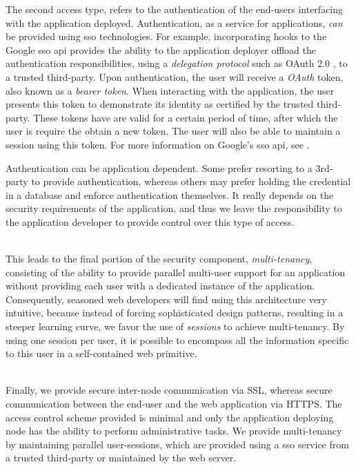 \documentclass[12pt, titlepage]{uo_temp}
\begin{document}
     The second access type, refers to the authentication of the end-users interfacing
     with the application deployed. Authentication, as a service for applications,
     \emph{can} be provided using \gls{sso} technologies. For example, incorporating hooks
     to the Google \gls{sso} \gls{api} provides the ability to the application deployer
     offload the authentication responsibilities, using a \emph{delegation protocol} such
     as OAuth 2.0 \cite{jones2012oauth}, to a trusted third-party. Upon authentication,
     the user will receive a \emph{OAuth} token, also known as a \emph{bearer token}. When
     interacting with the application, the user presents this token to demonstrate its
     identity as certified by the trusted third-party. These tokens have are valid for a
     certain period of time, after which the user is require the obtain a new token. The
     user will also be able to maintain a session using this token. For more information
     on Google's \gls{sso} \gls{api}, see \cite{google_sso}.

     Authentication can be application dependent. Some prefer resorting to a 3rd-party to
     provide authentication, whereas others may prefer holding the credential in a
     database and enforce authentication themselves. It really depends on the security
     requirements of the application, and thus we leave the responsibility to the
     application developer to provide control over this type of access.

     \\ This leads to the final portion of the security component, \emph{multi-tenancy},
     consisting of the ability to provide parallel multi-user support for an application
     without providing each user with a dedicated instance of the application.
     Consequently, seasoned web developers will find using this architecture very
     intuitive, because instead of forcing sophisticated design patterns, resulting in a
     steeper learning curve, we favor the use of \emph{sessions} to achieve
     multi-tenancy. By using one session per user, it is possible to encompass all the
     information specific to this user in a self-contained web primitive.

     \\ 
     Finally, we provide secure inter-node communication via SSL, whereas secure
     communication between the end-user and the web application via HTTPS. The access
     control scheme provided is minimal and only the application deploying node has the
     ability to perform administrative tasks. We provide multi-tenancy by maintaining
     parallel user-sessions, which are provided using a \gls{sso} service from a trusted
     third-party or maintained by the web server.
     
\end{document}

